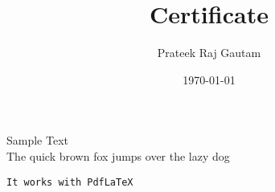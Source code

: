 \documentclass[12pt]{article}
\title{Certificate}
\author{Prateek Raj Gautam}
\date{\today}
\begin{document}
 
\maketitle
 
Sample Text\\
\Huge{The quick brown fox jumps over the lazy dog}

\begin{verbatim}
It works with PdfLaTeX
\end{verbatim}
 
 
\end{document}
